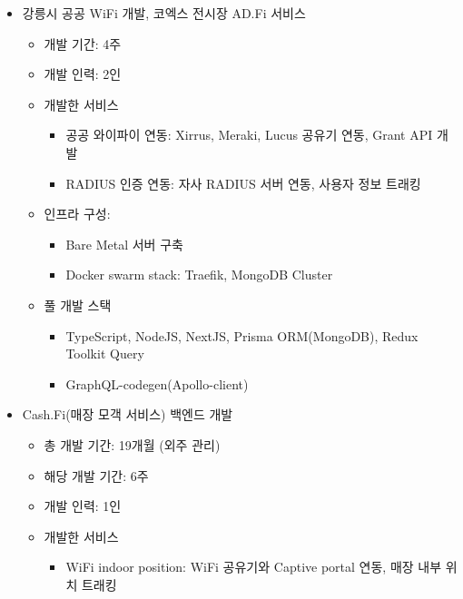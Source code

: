 \begin{itemize}[label=]
\begin{itemize}[label=]
\begin{itemize}[label=]
		      \item 강릉시 공공 WiFi 개발, 코엑스 전시장 AD.Fi 서비스 \hyperref[publicadfi]{\space {}}
		            \begin{itemize}[label=]
			            \item 개발 기간: 4주
			            \item 개발 인력: 2인
			            \item 개발한 서비스
			                  \begin{itemize}
				                  \item 공공 와이파이 연동: Xirrus, Meraki, Lucus 공유기 연동, Grant API 개발
				                  \item RADIUS 인증 연동: 자사 RADIUS 서버 연동, 사용자 정보 트래킹
			                  \end{itemize}
			            \item 인프라 구성:
			                  \begin{itemize}
				                  \item Bare Metal 서버 구축
				                  \item Docker swarm stack: Traefik, MongoDB Cluster
			                  \end{itemize}
			            \item 풀 개발 스택
			                  \begin{itemize}
				                  \item TypeScript, NodeJS, NextJS, Prisma ORM(MongoDB), Redux Toolkit Query
				                  \item GraphQL-codegen(Apollo-client)
			                  \end{itemize}
		            \end{itemize}
		      \item Cash.Fi(매장 모객 서비스) 백엔드 개발 \hyperref[cashfi]{\space {}}
		            \begin{itemize}[label=]
			            \item 총 개발 기간: 19개월 (외주 관리)
			            \item 해당 개발 기간: 6주
			            \item 개발 인력: 1인
			            \item 개발한 서비스
			                  \begin{itemize}
				                  \item WiFi indoor position: WiFi 공유기와 Captive portal 연동, 매장 내부 위치 트래킹

\end{itemize}
\end{itemize}
\end{itemize}
\end{itemize}
\end{itemize}
